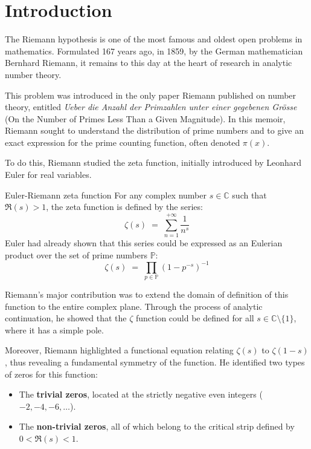 \documentclass[Riemann_Hypothesis.tex]{subfiles}
\begin{document}
\pagebreak
\color{red}
\part{Introduction}
\color{black}

The Riemann hypothesis is one of the most famous and oldest open problems 
in mathematics. Formulated 167 years ago, in 1859, by 
the German mathematician Bernhard Riemann, it remains to this day 
at the heart of research in analytic number theory. 

This problem was introduced in the only paper Riemann published on number 
theory, entitled \textit{Ueber die Anzahl der Primzahlen unter einer gegebenen 
Grösse} (On the Number of Primes Less Than a Given Magnitude). 
In this memoir, Riemann sought to understand the distribution of 
prime numbers and to give an exact expression for the prime counting 
function, often denoted $\pi(x)$.

To do this, Riemann studied the zeta function, initially introduced 
by Leonhard Euler for real variables.

\begin{DefNefEn}[label=df:FonctionZetaEuler_en]{Euler-Riemann zeta function}
    For any complex number $s \in \mathbb{C}$ such that $\Re(s) > 1$, 
    the zeta function is defined by the series:
    \begin{equation*}
        \zeta(s) \;=\; \sum_{n=1}^{+\infty} \frac{1}{n^s}
    \end{equation*}
    Euler had already shown that this series could 
    be expressed as an Eulerian product over the set of 
    prime numbers $\mathbb{P}$:
    \begin{equation*}
        \zeta(s) \;=\; \prod_{p \in \mathbb{P}} \left(1 - p^{-s}\right)^{-1}
    \end{equation*}
\end{DefNefEn}

Riemann's major contribution was to extend the domain of definition of 
this function to the entire complex plane. Through the process of analytic 
continuation, he showed that the $\zeta$ function could be defined for all 
$s \in \mathbb{C} \setminus \{1\}$, where it has a simple pole. 

Moreover, Riemann highlighted a functional equation relating $\zeta(s)$ 
to $\zeta(1-s)$, thus revealing a fundamental symmetry of the function. 
He identified two types of zeros for this function:
\begin{itemize}
    \item The \textbf{trivial zeros}, located at the strictly negative even integers ($-2, -4, -6, \dots$).
    \item The \textbf{non-trivial zeros}, all of which belong to the critical strip defined by $0 < \Re(s) < 1$.
\end{itemize}
\end{document}
